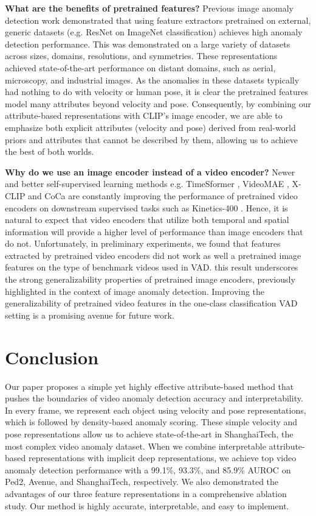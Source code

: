 \documentclass[10pt,twocolumn,letterpaper]{article}
\begin{document}
\textbf{What are the benefits of pretrained features?} Previous image anomaly detection work \cite{panda,mean_shifted} demonstrated that using feature extractors pretrained on external, generic datasets (e.g. ResNet on ImageNet classification) achieves high anomaly detection performance. This was demonstrated on a large variety of datasets across sizes, domains, resolutions, and symmetries. These representations achieved state-of-the-art performance on distant domains, such as aerial, microscopy, and industrial images. As the anomalies in these datasets typically had nothing to do with velocity or human pose, it is clear the pretrained features model many attributes beyond velocity and pose. Consequently, by combining our attribute-based representations with CLIP's image encoder, we are able to emphasize both explicit attributes (velocity and pose) derived from real-world priors and attributes that cannot be described by them, allowing us to achieve the best of both worlds.

\textbf{Why do we use an image encoder instead of a video encoder?} Newer and better self-supervised learning methods e.g. TimeSformer \cite{timesformer}, VideoMAE \cite{videomae}, X-CLIP \cite{x_clip} and CoCa \cite{coca} are constantly improving the performance of pretrained video encoders on downstream supervised tasks such as Kinetics-400 \cite{kinetics400}. Hence, it is natural to expect that video encoders that utilize both temporal and spatial information will provide a higher level of performance than image encoders that do not. Unfortunately, in preliminary experiments, we found that features extracted by pretrained video encoders did not work as well a pretrained image features on the type of benchmark videos used in VAD. this result underscores the strong generalizability properties of pretrained image encoders, previously highlighted in the context of image anomaly detection. Improving the generalizability of pretrained video features in the one-class classification VAD setting is a promising avenue for future work.

\section{Conclusion} Our paper proposes a simple yet highly effective attribute-based method that pushes the boundaries of video anomaly detection accuracy and interpretability. In every frame, we represent each object using velocity and pose representations, which is followed by density-based anomaly scoring. These simple velocity and pose representations allow us to achieve state-of-the-art in ShanghaiTech, the most complex video anomaly dataset. When we combine interpretable attribute-based representations with implicit deep representations, we achieve top video anomaly detection performance with a 99.1\%, 93.3\%, and 85.9\% AUROC on Ped2, Avenue, and ShanghaiTech, respectively. We also demonstrated the advantages of our three feature representations in a comprehensive ablation study. Our method is highly accurate, interpretable, and easy to implement.

{\small


}
\end{document}
